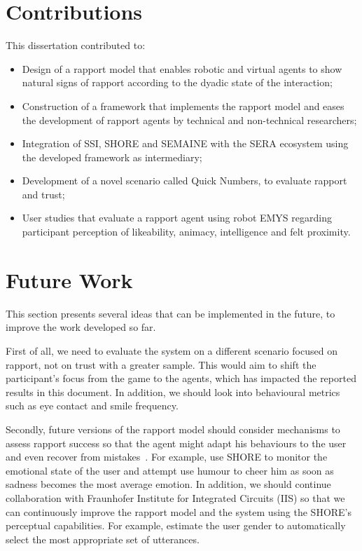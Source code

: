 
\section{Contributions}
\label{sec:contributions}

This dissertation contributed to:
\begin{itemize}
    \item Design of a rapport model that enables robotic and virtual agents to show natural signs of rapport according to the dyadic state of the interaction;
    \item Construction of a framework that implements the rapport model and eases the development of rapport agents by technical and non-technical researchers;
    \item Integration of \ac{SSI}, SHORE and SEMAINE with the \ac{SERA} ecosystem using the developed framework as intermediary;
    \item Development of a novel scenario called Quick Numbers, to evaluate rapport and trust;
    \item User studies that evaluate a rapport agent using robot \ac{EMYS} regarding participant perception of likeability, animacy, intelligence and felt proximity.
\end{itemize}

\section{Future Work}

This section presents several ideas that can be implemented in the future, to improve the work developed so far.

First of all, we need to evaluate the system on a different scenario focused on rapport, not on trust with a greater sample. This would aim to shift the participant's focus from the game to the agents, which has impacted the reported results in this document. In addition, we should look into behavioural metrics such as eye contact and smile frequency.

Secondly, future versions of the rapport model should consider mechanisms to assess rapport success so that the agent might adapt his behaviours to the user and even recover from mistakes~\cite{Kahn2008}. For example, use SHORE to monitor the emotional state of the user and attempt use humour to cheer him as soon as sadness becomes the most average emotion. In addition, we should continue collaboration with Fraunhofer Institute for Integrated Circuits (IIS) so that we can continuously improve the rapport model and the system using the SHORE's perceptual capabilities. For example, estimate the user gender to automatically select the most appropriate set of utterances.

